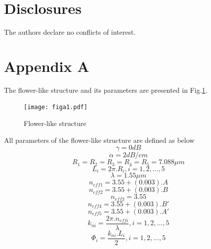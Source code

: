 \documentclass{osa-article}
\begin{document}
\section*{Disclosures}
The authors declare no conflicts of interest.

\appendix
\section*{Appendix A}
\label{Appendix A}
The flower-like structure and its parameters are presented in Fig.\ref{figa1}.
   \begin{figure}[tb]
\centering
\texttt{[image: figa1.pdf]}
	\caption{Flower-like structure}
	\label{figa1}
\end{figure}
All parameters of the flower-like structure are defined as below\\
 \begin{equation}
\gamma=0 dB
\label{eqa1}
\end{equation}
 \begin{equation}
\alpha=2 dB/cm
\label{eqa2}
\end{equation}
 \begin{equation}
R_1=R_2=R_3=R_4=R_5=7.088 {\mu}m
\label{eqa3}
\end{equation}
 \begin{equation}
L_i=2{\pi}.{R_i}, i=1, 2,..., 5
\label{eqa4}
\end{equation}
 \begin{equation}
\lambda=1.55{\mu}m
\label{eqa5}
\end{equation}
 \begin{equation}
n_{eff1}=3.55+(0.003).A
\label{eqa6}
\end{equation}
 \begin{equation}
n_{eff2}=3.55+(0.003).B
\label{eqa7}
\end{equation}
 \begin{equation}
n_{eff3}=3.55
\label{eqa8}
\end{equation}
 \begin{equation}
n_{eff4}=3.55+(0.003). B'
\label{eqa9}
\end{equation}
 \begin{equation}
n_{eff5}=3.55+(0.003). A'
\label{eqa10}
\end{equation}
 \begin{equation}
k_{ni}=\frac{2{\pi}.n_{effi}}{\lambda}, i=1, 2, ..., 5
\label{eqa11}
\end{equation}
 \begin{equation}
\Phi_{i}=\frac{k_{ni}.L_{i}}{2}, i=1, 2, ..., 5
\label{eqa12}
\end{equation}
\end{document}
